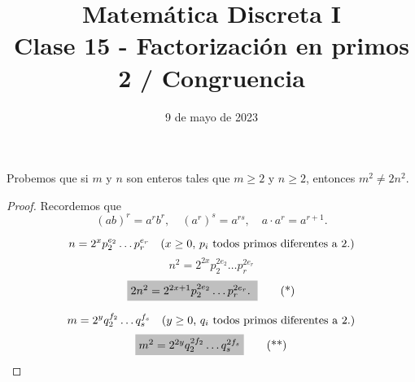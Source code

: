 \documentclass[handout]{beamer} %
\title[Clase 15 - Factorización en primos]{Matemática Discreta I \\ Clase 15 - Factorización en primos 2 / Congruencia}
\institute[]{\normalsize FAMAF / UNC
    \\[\baselineskip] ${}^{}$
    \\[\baselineskip]
}
\date[09/05/2023]{9 de mayo de 2023}
\begin{document}
    
    \frame{\titlepage} 
    
    
    \begin{frame}
        
        \begin{ejemplo} Probemos que si $m$ y $n$ son enteros tales que
            $m\ge 2$ y $n\ge 2$, entonces $m^2 \not=2n^2$.
        \end{ejemplo}\pause
        \begin{proof} \pause

        Recordemos que
        $$
        (ab)^r = a^rb^r, \quad (a^r)^s = a^{r s}, \quad  a\cdot a^r = a^{r+1}. 
        $$    


            $$ n = 2^{x}p_2^{e_2}\ldots p_r^{e_r}\text{\quad ($x \ge 0$, $p_i$ todos primos diferentes a 2.)} $$
            $$ n^2 = 2^{2x}p_2^{2e_2}\ldots p_r^{2e_r}$$
            \begin{equation}
                \colorbox{lightgray}{$2n^2= 2^{2x+1}p_2^{2e_2}\ldots p_r^{2e_r}.$ }\tag{*}
            \end{equation}
            
            $$
            m = 2^{y}q_2^{f_2}\ldots q_s^{f_s}\text{\quad ($y \ge 0$, $q_i$ todos primos diferentes a 2.)}
            $$
            \begin{equation}
                \colorbox{lightgray}{$m^2 = 2^{2y}q_2^{2f_2}\ldots q_s^{2f_s}$} \tag{**}
            \end{equation}
            
        \end{proof}
        
    \end{frame}
    
\end{document}
